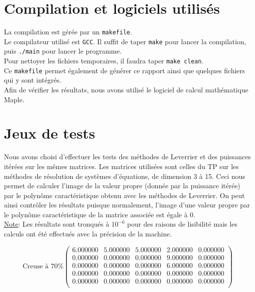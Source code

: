 \documentclass{report}
\begin{document}

\newpage


    \section{Compilation et logiciels utilisés}
      \noindent La compilation est gérée par un \verb"makefile".\\
      Le compilateur utilisé est \verb"GCC".
      Il suffit de taper \verb"make" pour lancer la compilation, puis \verb"./main" pour lancer le programme.\\
      Pour nettoyer les fichiers temporaires, il faudra taper \verb"make clean".\\
      Ce \verb"makefile" permet également de générer ce rapport ainsi que quelques fichiers qui y sont intégrés.\\
      
      Afin de vérifier les résultats, nous avons utilisé le logiciel de calcul mathématique Maple.\\
      
    \section{Jeux de tests}
      Nous avons choisi d'effectuer les tests des méthodes de Leverrier et des puissances itérées sur les mêmes matrices. Les matrices utilisées sont celles du TP sur les méthodes de résolution de systèmes d'équations, de dimension 3 à 15. Ceci nous permet de calculer l'image de la valeur propre (donnée par la puissance itérée) par le polynôme caractéristique obtenu avec les méthodes de Leverrier. On peut ainsi contrôler les résultats puisque normalement, l'image d'une valeur propre par le polynôme caractéristique de la matrice associée est égale à 0. \\
      
      \underline{Note}: Les résultats sont tronqués à $10^{-6}$ pour des raisons de lisibilité mais les calculs ont été effectués avec la précision de la machine.
      
      \begin{equation}
	\textrm{Creuse à 70\%}
	\begin{pmatrix}
	  6.000000 & 5.000000 & 5.000000 & 2.000000 & 0.000000 \\ 
	  0.000000 & 0.000000 & 0.000000 & 9.000000 & 0.000000 \\ 
	  0.000000 & 0.000000 & 0.000000 & 6.000000 & 0.000000 \\ 
	  0.000000 & 0.000000 & 0.000000 & 0.000000 & 0.000000 \\ 
	  0.000000 & 0.000000 & 0.000000 & 0.000000 & 0.000000 \\ 
	\end{pmatrix}
	\label{syst1}
      \end{equation}
	
\end{document}
